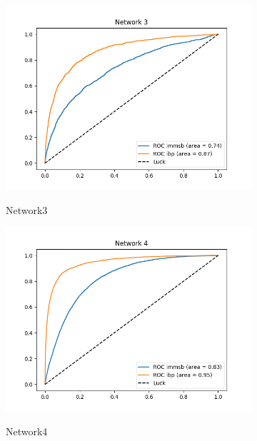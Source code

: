 \begin{figure}[h]
        \begin{subfigure}[b]{0.300\textwidth}
            \centering
            \includegraphics[width=\textwidth]{img/corpus/roc_generator10}
            \label{fig:mean and std of net14}
            \caption {{\small Network3}}    
        \end{subfigure}
        \begin{subfigure}[b]{0.300\textwidth}
            \centering
            \includegraphics[width=\textwidth]{img/corpus/roc_generator4}
            \label{fig:mean and std of net14}
            \caption {{\small Network4}}    
        \end{subfigure}
        \begin{subfigure}[b]{0.300\textwidth}

\end{subfigure}
\end{figure}
